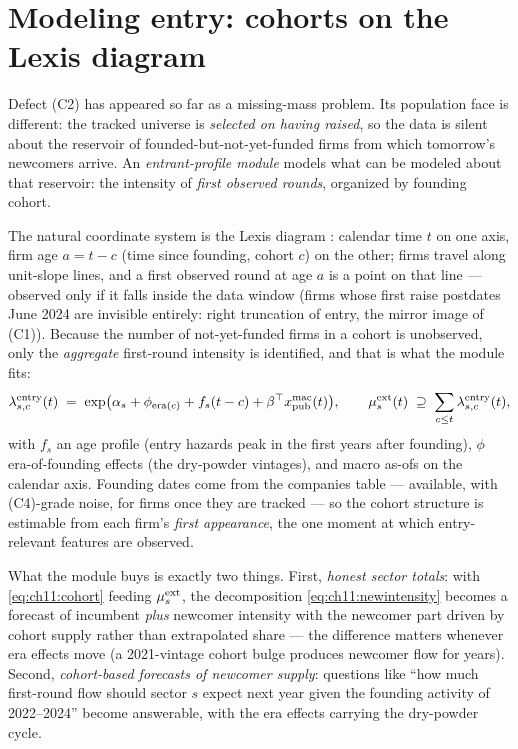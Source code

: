 \section{Modeling entry: cohorts on the Lexis diagram}\label{ch11:sec:entry}

Defect (C2) has appeared so far as a missing-mass problem. Its population
face is different: the tracked universe is \emph{selected on having
raised}, so the data is silent about the reservoir of founded-but-not-yet-funded
firms from which tomorrow's newcomers arrive. An \emph{entrant-profile
module} models what can be modeled about that reservoir: the intensity of
\emph{first observed rounds}, organized by founding cohort.

The natural coordinate system is the Lexis diagram \citep{keiding1990}:
calendar time $t$ on one axis, firm age $a = t - c$ (time since founding,
cohort $c$) on the other; firms travel along unit-slope lines, and a
first observed round at age $a$ is a point on that line --- observed only
if it falls inside the data window (firms whose first raise postdates
June 2024 are invisible entirely: right truncation of entry, the
mirror image of (C1)). Because the number of not-yet-funded firms in a
cohort is unobserved, only the \emph{aggregate} first-round intensity is
identified, and that is what the module fits:
\begin{equation}\label{eq:ch11:cohort}
\lambda^{\mathrm{entry}}_{s,c}(t)
 \;=\;
 \exp\!\big(\alpha_s + \phi_{\mathrm{era}(c)} + f_s(t - c)
 + \beta^{\top} x^{\mathrm{mac}}_{\mathrm{pub}}(t)\big),
\qquad
\mu_s^{\mathrm{ext}}(t) \;\supseteq\; \sum_{c \le t} \lambda^{\mathrm{entry}}_{s,c}(t),
\end{equation}
with $f_s$ an age profile (entry hazards peak in the first years after
founding), $\phi$ era-of-founding effects (the dry-powder vintages), and
macro as-ofs on the calendar axis. Founding dates come from the
companies table --- available, with (C4)-grade noise, for firms once they
are tracked --- so the cohort structure is estimable from each firm's
\emph{first appearance}, the one moment at which entry-relevant features
are observed.

What the module buys is exactly two things. First, \emph{honest sector
totals}: with \cref{eq:ch11:cohort} feeding
$\mu_s^{\mathrm{ext}}$, the decomposition
\cref{eq:ch11:newintensity} becomes a forecast of incumbent
\emph{plus} newcomer intensity with the newcomer part driven by cohort
supply rather than extrapolated share --- the difference matters whenever
era effects move (a 2021-vintage cohort bulge produces newcomer flow for
years). Second, \emph{cohort-based forecasts of newcomer supply}:
questions like ``how much first-round flow should sector $s$ expect next
year given the founding activity of 2022--2024'' become answerable, with
the era effects carrying the dry-powder cycle.

